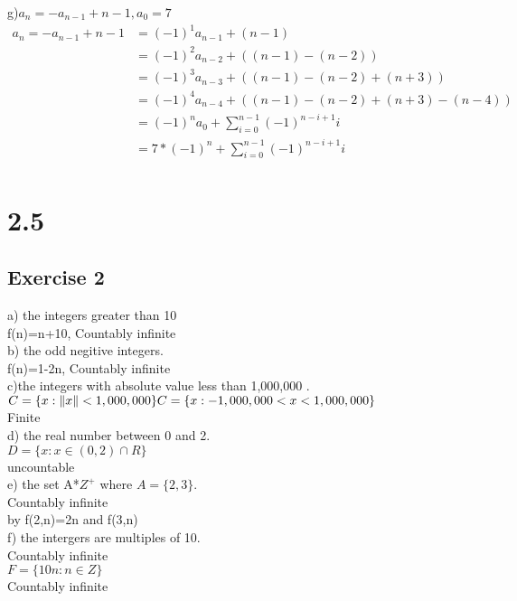 \documentclass[12pt]{article}
\begin{document}
g)$a_{n}=-a_{n-1}+n-1,a_0=7$\\
\begin{equation}\nonumber
    \begin{split}
        a_n=-a_{n-1}+n-1&=(-1)^1a_{n-1}+(n-1)\\
        &=(-1)^2a_{n-2}+((n-1)-(n-2))\\
        &=(-1)^3a_{n-3}+((n-1)-(n-2)+(n+3))\\
        &=(-1)^4a_{n-4}+((n-1)-(n-2)+(n+3)-(n-4))\\
        &=(-1)^na_0+\sum_{i=0}^{n-1}(-1)^{n-i+1}i\\
        &=7*(-1)^n+\sum_{i=0}^{n-1}(-1)^{n-i+1}i\\
    \end{split}
\end{equation}

\section*{2.5}
\subsection*{Exercise 2}
a) the integers greater than 10 \\
f(n)=n+10, Countably infinite\\

b) the odd negitive integers.\\
f(n)=1-2n, Countably infinite\\

c)the integers with absolute value less than 1,000,000 .\\
$C=\{x:\|x\|<1,000,000\}\\
C=\{x:-1,000,000<x<1,000,000\}$\\
Finite\\

d) the real number between 0 and 2. \\
$D=\{x:x\in (0,2)\cap R\}$\\
uncountable\\

e) the set A*$Z^+$ where $A=\{2,3\}$.\\
Countably infinite\\
by f(2,n)=2n and f(3,n)\\

f) the intergers are multiples of 10. \\
Countably infinite\\
$F=\{10n:n\in Z\}$\\
Countably infinite\\
\end{document}
